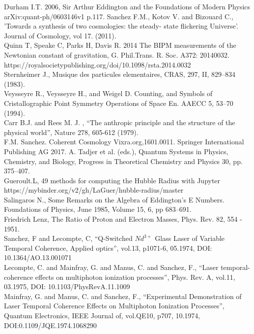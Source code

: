 \documentclass[a4paper,9pt]{article}
\begin{document}
\begin{thebibliography}{99}
 Durham I.T. 2006, Sir Arthur Eddington and the Foundations of Modern Physics arXiv:quant-ph/0603146v1  p.117.
 Sanchez F.M., Kotov V. and Bizouard C., 'Towards a synthesis of two cosmologies: the steady- state flickering Universe'. Journal of Cosmology, vol 17. (2011).\\
 Quinn T, Speake C, Parks H, Davis R. 2014 The BIPM measurements of the Newtonian constant of gravitation, G. Phil.Trans. R. Soc. A372: 20140032. https://royalsocietypublishing.org/doi/10.1098/rsta.2014.0032 \\
 Sternheimer J., Musique des particules elementaires, CRAS, 297, II, 829--834 (1983).\\
 Veysseyre R., Veysseyre H., and Weigel D. Counting, and Symbols of Cristallographic Point Symmetry Operations of Space En. AAECC 5, 53--70 (1994).\\
 Carr B.J. and Rees M. J. , “The anthropic principle and the structure of the physical world”, Nature 278, 605-612 (1979).\\
 F.M. Sanchez. Coherent Cosmology Vixra.org,1601.0011. Springer International Publishing AG 2017. A. Tadjer et al. (eds.), Quantum Systems in Physics, Chemistry, and Biology, Progress in Theoretical Chemistry and Physics 30, pp. 375--407. \\ 
 Gueroult.L, 49 methods for computing the Hubble Radius with Jupyter https://mybinder.org/v2/gh/LaGuer/hubble-radius/master \\
 Salingaros N., Some Remarks on the Algebra of Eddington's E Numbers. Foundations of Physics, June 1985, Volume 15, 6, pp 683–691.\\
 Friedrich Lenz, The Ratio of Proton and Electron Masses, Phys. Rev. 82, 554 - 1951.\\

 Sanchez, F and Lecompte, C, ``Q-Switched $Nd^{3+}$ Glass Laser of Variable Temporal Coherence, Applied optics'', vol.13, p1071-6, 05.1974, DOI: 10.1364/AO.13.001071 \\


 Lecompte, C. and Mainfray, G. and Manus, C. and Sanchez, F., ``Laser temporal-coherence effects on multiphoton ionization processes'', Phys. Rev. A, vol.11, 03.1975, DOI: 10.1103/PhysRevA.11.1009 \\

 Mainfray, G. and Manus, C. and Sanchez, F., ``Experimental Demonstration of Laser Temporal Coherence Effects on Multiphoton Ionization Processes'', Quantum Electronics, IEEE Journal of, vol.QE10, p707, 10.1974, DOI:0.1109/JQE.1974.1068290 \\



\end{thebibliography}
\end{document}
